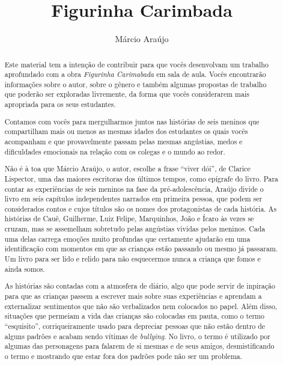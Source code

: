 \documentclass[11pt]{extarticle}
\newcommand{\AutorLivro}{Márcio Araújo}
\newcommand{\TituloLivro}{Figurinha Carimbada}
\newcommand{\colaborador}{Gabriela Karam}
\begin{document}
\title{\TituloLivro}
\author{\AutorLivro}
\def\authornotes{\colaborador}

\date{}
\maketitle


\tableofcontents


\begin{abstract}

Este material tem a intenção de contribuir para que vocês desenvolvam um trabalho aprofundado com a obra \textit{Figurinha Carimabada} em sala de aula.
Vocês encontrarão informações sobre o autor, sobre o gênero e também 
algumas propostas de trabalho que poderão ser exploradas livremente, 
da forma que vocês considerarem mais apropriada para os seus estudantes.

Contamos com vocês para mergulharmos juntos nas histórias de seis meninos que compartilham mais ou menos as mesmas idades dos estudantes os quais vocês acompanham e que provavelmente passam pelas mesmas angústias, medos e dificuldades emocionais na relação com os colegas e o mundo ao redor. 

Não é à toa que Márcio Araújo, o autor, escolhe a frase ``viver dói'', de Clarice Lispector, uma das maiores escritoras dos últimos tempos, como epígrafe do livro. Para contar as experiências de seis meninos na fase da pré-adolescência, Araújo divide o livro em seis capítulos independentes narrados em primeira pessoa, que podem ser considerados contos e cujos títulos são os nomes dos protagonistas de cada história. As histórias de Cauê, Guilherme, Luiz Felipe, Marquinhos, João e Ícaro às vezes se cruzam, mas se assemelham sobretudo pelas angústias vividas pelos meninos. Cada uma delas carrega emoções muito profundas que certamente ajudarão em uma identificação com momentos em que as crianças estão passando ou mesmo já passaram. Um livro para ser lido e relido para não esquecermos nunca a criança que fomos e ainda somos.

As histórias são contadas com a atmosfera de diário, algo que pode servir de inpiração para que as crianças passem a escrever mais sobre suas experiências e aprendam a externalizar sentimentos que não são verbalizados nem colocados no papel. Além disso, situações que permeiam a vida das crianças são colocadas em pauta, como o termo ``esquisito'', corriqueiramente usado para depreciar pessoas que não estão dentro de alguns padrões e acabam sendo vítimas de \textit{bullying}. No livro, o termo é utilizado por algumas das personagens para falarem de si mesmas e de seus amigos, desmistificando o termo e mostrando que estar fora dos padrões pode não ser um problema. 


\end{abstract}
\end{document}
